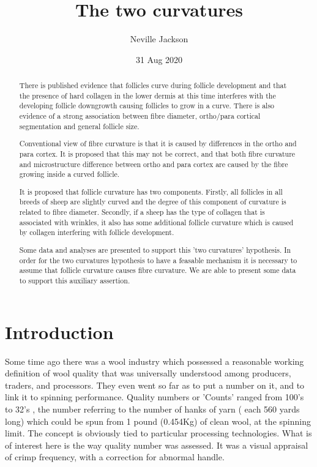 \documentclass{article}
\begin{document}
\title{The two curvatures}
\author{Neville Jackson}
\date{31 Aug 2020}

\maketitle

\begin{abstract}

There is published evidence that follicles curve during follicle development and that the presence of hard collagen in the lower dermis at this time interferes with the developing follicle downgrowth causing follicles to grow in a curve.  
 There is also evidence of a strong association between fibre diameter, ortho/para cortical segmentation and general follicle size.

Conventional view of fibre curvature is that it is caused by differences in the ortho and para cortex. It is proposed that this may not be correct, and that both fibre curvature and microstructure difference between ortho and para cortex are caused by the fibre growing inside a curved follicle. 

It is proposed that follicle curvature has two components. Firstly, all follicles in all breeds of sheep are slightly curved and the degree of this component of curvature is related to fibre diameter. Secondly, if a sheep has the type of collagen that is associated with wrinkles, it also has some additional follicle curvature which is caused by collagen interfering with follicle development.

Some data and analyses are presented to support this 'two curvatures' hypothesis. In order for the two curvatures hypothesis to have a feasable mechanism it is necessary to assume that follicle curvature causes fibre curvature. We are able to present some data to support this  auxiliary assertion.
\end{abstract}


\section{Introduction}

Some time ago there was a wool industry which possessed a reasonable working definition of wool quality that was universally understood among producers, traders, and processors. They even went so far as to put a number on it, and to link it to spinning performance. Quality numbers  or 'Counts' ranged from 100's to 32's , the number referring to the number of hanks of yarn ( each 560 yards long)  which could be spun from 1 pound (0.454Kg) of clean wool, at the spinning limit. The concept is obviously tied to particular processing technologies. What is of interest here is the way quality number was assessed.  It was a visual appraisal of crimp frequency, with a correction for abnormal handle.
\end{document}
